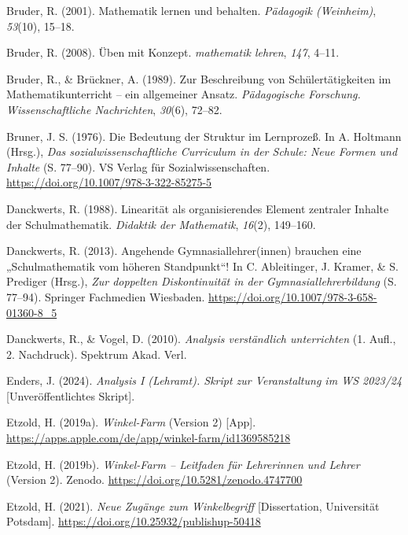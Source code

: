 \documentclass[
]{scrbook}
\newlength{\cslhangindent}
\newenvironment{CSLReferences}[2] %
 {\begin{list}{}{%
  \setlength{\itemindent}{0pt}
  \setlength{\leftmargin}{0pt}
  \setlength{\parsep}{0pt}
  \ifodd #1
   \setlength{\leftmargin}{\cslhangindent}
   \setlength{\itemindent}{-1\cslhangindent}
  \fi
  \setlength{\itemsep}{#2\baselineskip}}}
 {\end{list}}
\theoremstyle{definition}
\theoremstyle{definition}
\theoremstyle{definition}
\theoremstyle{definition}
\theoremstyle{remark}
\begin{document}
\begin{CSLReferences}{1}{0}
Bruder, R. (2001). Mathematik lernen und behalten. \emph{Pädagogik (Weinheim)}, \emph{53}(10), 15--18.

Bruder, R. (2008). Üben mit {Konzept}. \emph{mathematik lehren}, \emph{147}, 4--11.

Bruder, R., \& Brückner, A. (1989). Zur {Beschreibung} von {Schülertätigkeiten} im {Mathematikunterricht} -- ein allgemeiner {Ansatz}. \emph{Pädagogische Forschung. Wissenschaftliche Nachrichten}, \emph{30}(6), 72--82.

Bruner, J. S. (1976). Die {Bedeutung} der {Struktur} im {Lernprozeß}. In A. Holtmann (Hrsg.), \emph{Das sozialwissenschaftliche {Curriculum} in der {Schule}: {Neue} {Formen} und {Inhalte}} (S. 77--90). VS Verlag für Sozialwissenschaften. \url{https://doi.org/10.1007/978-3-322-85275-5}

Danckwerts, R. (1988). Linearität als organisierendes Element zentraler Inhalte der Schulmathematik. \emph{Didaktik der Mathematik}, \emph{16}(2), 149--160.

Danckwerts, R. (2013). Angehende {Gymnasiallehrer}(innen) brauchen eine „{Schulmathematik} vom höheren {Standpunkt}``! In C. Ableitinger, J. Kramer, \& S. Prediger (Hrsg.), \emph{Zur doppelten {Diskontinuität} in der {Gymnasiallehrerbildung}} (S. 77--94). Springer Fachmedien Wiesbaden. \url{https://doi.org/10.1007/978-3-658-01360-8_5}

Danckwerts, R., \& Vogel, D. (2010). \emph{Analysis verständlich unterrichten} (1. Aufl., 2. Nachdruck). Spektrum Akad. Verl.

Enders, J. (2024). \emph{Analysis {I} ({Lehramt}). {Skript} zur {Veranstaltung} im {WS} 2023/24} {[}Unveröffentlichtes Skript{]}.

Etzold, H. (2019a). \emph{Winkel-{Farm}} (Version 2) {[}App{]}. \url{https://apps.apple.com/de/app/winkel-farm/id1369585218}

Etzold, H. (2019b). \emph{Winkel-{Farm} -- {Leitfaden} für {Lehrerinnen} und {Lehrer}} (Version 2). Zenodo. \url{https://doi.org/10.5281/zenodo.4747700}

Etzold, H. (2021). \emph{Neue Zugänge zum Winkelbegriff} {[}Dissertation, Universität Potsdam{]}. \url{https://doi.org/10.25932/publishup-50418}


\end{CSLReferences}
\end{document}
